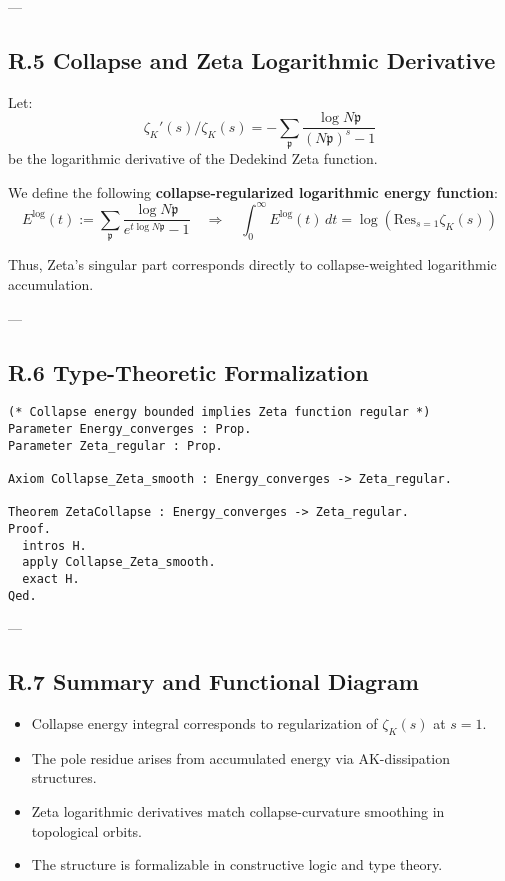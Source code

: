 \documentclass[11pt]{article}
\begin{document}
\begin{axiom}
\begin{axiom}
{{---

\subsection*{R.5 Collapse and Zeta Logarithmic Derivative}

Let:
\[
\zeta_K'(s)/\zeta_K(s) = - \sum_{\mathfrak{p}} \frac{\log N\mathfrak{p}}{(N\mathfrak{p})^s - 1}
\]
be the logarithmic derivative of the Dedekind Zeta function.

We define the following \textbf{collapse-regularized logarithmic energy function}:
\[
E^\log(t) := \sum_{\mathfrak{p}} \frac{\log N\mathfrak{p}}{e^{t \log N\mathfrak{p}} - 1}
\quad \Rightarrow \quad \int_0^\infty E^\log(t)\, dt = \log\left( \mathrm{Res}_{s=1} \zeta_K(s) \right)
\]

Thus, Zeta's singular part corresponds directly to collapse-weighted logarithmic accumulation.

---

\subsection*{R.6 Type-Theoretic Formalization}

\begin{verbatim}
(* Collapse energy bounded implies Zeta function regular *)
Parameter Energy_converges : Prop.
Parameter Zeta_regular : Prop.

Axiom Collapse_Zeta_smooth : Energy_converges -> Zeta_regular.

Theorem ZetaCollapse : Energy_converges -> Zeta_regular.
Proof.
  intros H.
  apply Collapse_Zeta_smooth.
  exact H.
Qed.
\end{verbatim}

---

\subsection*{R.7 Summary and Functional Diagram}

\begin{itemize}
  \item Collapse energy integral corresponds to regularization of $\zeta_K(s)$ at $s = 1$.
  \item The pole residue arises from accumulated energy via AK-dissipation structures.
  \item Zeta logarithmic derivatives match collapse-curvature smoothing in topological orbits.
  \item The structure is formalizable in constructive logic and type theory.
\end{itemize}

}}
\end{axiom}
\end{axiom}
\end{document}
